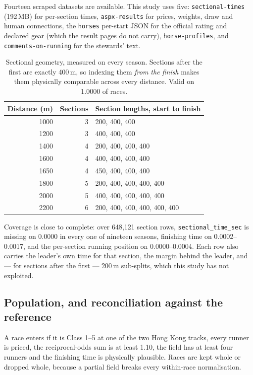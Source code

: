 \documentclass[11pt,a4paper]{article}
\begin{document}
Fourteen scraped datasets are available. This study uses five: \texttt{sectional-times}
(192\,MB) for per-section times, \texttt{aspx-results} for prices, weights, draw
and human connections, the \texttt{horses} per-start JSON for the official rating
and declared gear (which the result pages do not carry), \texttt{horse-profiles},
and \texttt{comments-on-running} for the stewards' text.

\begin{table}[htbp]\centering\small
\caption{Sectional geometry, measured on every season. Sections after the first
are exactly 400\,m, so indexing them \emph{from the finish} makes them physically
comparable across every distance. Valid on 1.0000 of races.}
\begin{tabular}{rrl}
\toprule
Distance (m) & Sections & Section lengths, start to finish\\
\midrule
1000 & 3 & 200, 400, 400\\
1200 & 3 & 400, 400, 400\\
1400 & 4 & 200, 400, 400, 400\\
1600 & 4 & 400, 400, 400, 400\\
1650 & 4 & 450, 400, 400, 400\\
1800 & 5 & 200, 400, 400, 400, 400\\
2000 & 5 & 400, 400, 400, 400, 400\\
2200 & 6 & 200, 400, 400, 400, 400, 400\\
\bottomrule
\end{tabular}
\end{table}

Coverage is close to complete: over 648{,}121 section rows,
\texttt{sectional\_time\_sec} is missing on 0.0000 in every one of nineteen
seasons, finishing time on 0.0002--0.0017, and the per-section running position on
0.0000--0.0004. Each row also carries the leader's own time for that section,
the margin behind the leader, and --- for sections after the first --- 200\,m
sub-splits, which this study has not exploited.

\subsection{Population, and reconciliation against the reference}

A race enters if it is Class 1--5 at one of the two Hong Kong tracks, every runner
is priced, the reciprocal-odds sum is at least 1.10, the field has at least four
runners and the finishing time is physically plausible. Races are kept whole or
dropped whole, because a partial field breaks every within-race normalisation.
\end{document}
